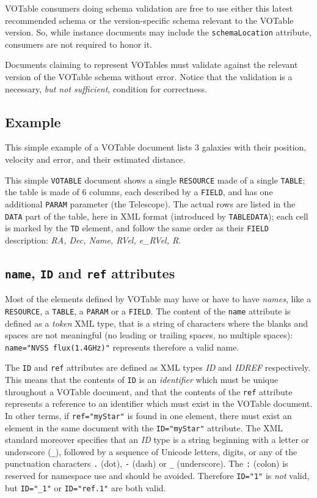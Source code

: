 \documentclass[11pt,a4paper]{ivoa}
\let\fg=\color
\def\attr#1{{\tt{\fg{DarkRed}#1}}}
\def\elem#1{{\tt{\fg{DarkRed}#1}}}
\def\attrval#1#2{{\tt{\fg{DarkRed}#1}="{\fg{DarkPurple}#2}"}}
\begin{document}
VOTable consumers doing schema validation
are free to use either this latest recommended schema or the version-specific
schema relevant to the VOTable version. So, while instance documents
may include the \attr{schemaLocation} attribute, consumers are not required
to honor it.

Documents claiming to represent VOTables must validate against the
relevant version of the VOTable schema without error.  Notice that the
validation is a necessary, {\em but not sufficient}, condition for correctness.

\subsection{Example}

This simple example of a VOTable document lists 3 galaxies with their
position, velocity and error, and their estimated distance.

\label{example1}
\begingroup\small

\endgroup

This simple \elem{VOTABLE} document shows a single \elem{RESOURCE} made of a single \elem{TABLE};
the table is made of 6 columns, each described by a \elem{FIELD}, and has
one additional \elem{PARAM} parameter (the Telescope). The actual rows are
listed in the \elem{DATA} part of the table, here in  XML format
(introduced by \elem{TABLEDATA}); each cell is marked by the \elem{TD} element,
and follow the same order as their \elem{FIELD} description:
{\sl RA, Dec, Name, RVel, e\_RVel, R}.


\subsection{{\attr{name}, \attr{ID} and \attr{ref} attributes}}
\label{sec:name}

Most of the elements defined by VOTable may have or have to have {\em names},
like a \elem{RESOURCE}, a \elem{TABLE}, a \elem{PARAM} or a \elem{FIELD}.
The content of the \attr{name} attribute is defined as a {\em token}
XML type,
that is a string of characters where the blanks and spaces are not
meaningful (no leading or trailing spaces, no multiple spaces):
\attrval{name}{NVSS flux(1.4GHz)} represents therefore
a valid name.

The \attr{ID} and \attr{ref} attributes are defined as XML types {\em ID}
and {\em IDREF} respectively. This means that the contents of \attr{ID}
is an {\em identifier} which must be {unique} throughout a VOTable document,
and that the contents of the \attr{ref} attribute represents a reference to
an identifier which must exist in the VOTable document.
In other terms, if \attrval{ref}{myStar} is found in one element,
there must exist an element in the same document with the
\attrval{ID}{myStar} attribute. The XML standard moreover specifies
that an {\em ID} type is a string beginning with a letter or
underscore ({\tt{\_}}),
followed by a sequence of Unicode letters, digits, or any of the
punctuation characters {\tt.} (dot), {\tt-} (dash) or {\tt\_} (underscore).
The {\tt:} (colon) is reserved for namespace use and should be avoided.
Therefore \attrval{ID}{1} is {\em not} valid,
but \attrval{ID}{\_1} or \attrval{ID}{ref.1} are both valid.
\end{document}
